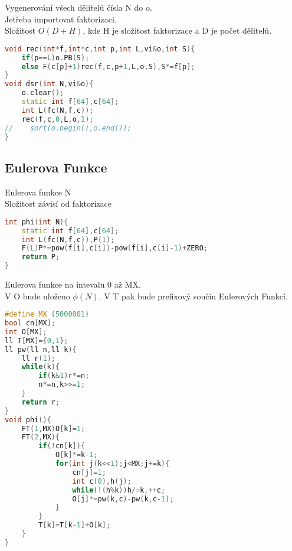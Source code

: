 \documentclass[11pt]{article}
\begin{document}
Vygenerování všech dělitelů čísla \textsf{N} do \textsf{o}.
\\Jetřeba importovat faktorizaci.
\\Složitost $O(D+H)$, kde \textsf{H} je složitost faktorizace a \textsf{D} je počet dělitelů.
\begin{lstlisting}[language=C++]
void rec(int*f,int*c,int p,int L,vi&o,int S){
    if(p==L)o.PB(S);
    else F(c[p]+1)rec(f,c,p+1,L,o,S),S*=f[p];
}
void dsr(int N,vi&o){
    o.clear();
    static int f[64],c[64];
    int L(fc(N,f,c));
    rec(f,c,0,L,o,1);
//    sort(o.begin(),o.end());
}
\end{lstlisting}
\subsection{Eulerova Funkce}
Eulerova funkce \textsf{N}
\\Složitost závisí od faktorizace
\begin{lstlisting}[language=C++]
int phi(int N){
    static int f[64],c[64];
    int L(fc(N,f,c)),P(1);
    F(L)P*=pow(f[i],c[i])-pow(f[i],c[i]-1)+ZERO;
    return P;
}
\end{lstlisting}
Eulerova funkce na intevalu 0 až \textsf{MX}.
\\V \textsf{O} bude uloženo $\phi(N)$. V \textsf{T} pak bude prefixový součin Eulerových Funkcí.
\begin{lstlisting}[language=C++]
#define MX (5000001)
bool cn[MX];
int O[MX];
ll T[MX]={0,1};
ll pw(ll n,ll k){
    ll r(1);
    while(k){
        if(k&1)r*=n;
        n*=n,k>>=1;
    }
    return r;
}
void phi(){
    FT(1,MX)O[k]=1;
    FT(2,MX){
        if(!cn[k]){
            O[k]*=k-1;
            for(int j(k<<1);j<MX;j+=k){
                cn[j]=1;
                int c(0),h(j);
                while(!(h%k))h/=k,++c;
                O[j]*=pw(k,c)-pw(k,c-1);
            }
        }
        T[k]=T[k-1]+O[k];
    }
}
\end{lstlisting}
\end{document}

